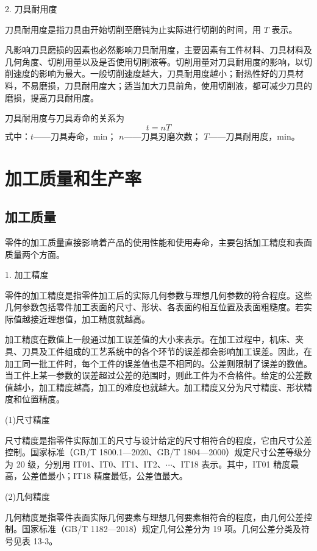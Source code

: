 \documentclass[UTF8]{ctexbook}
\newcommand{\◎}{\ensuremath{\bigcirc}}
\begin{document}
2. 刀具耐用度

刀具耐用度是指刀具由开始切削至磨钝为止实际进行切削的时间，用 $T$ 表示。

凡影响刀具磨损的因素也必然影响刀具耐用度，主要因素有工件材料、刀具材料及几何角度、切削用量以及是否使用切削液等。切削用量对刀具耐用度的影响，以切削速度的影响为最大。一般切削速度越大，刀具耐用度越小；耐热性好的刀具材料，不易磨损，刀具耐用度大；适当加大刀具前角，使用切削液，都可减少刀具的磨损，提高刀具耐用度。

刀具耐用度与刀具寿命的关系为
\[ t = nT \]
式中：$t$——刀具寿命，min；
$n$——刀具刃磨次数；
$T$——刀具耐用度，min。

\section{加工质量和生产率}

\subsection{加工质量}

零件的加工质量直接影响着产品的使用性能和使用寿命，主要包括加工精度和表面质量两个方面。

1. 加工精度

零件的加工精度是指零件加工后的实际几何参数与理想几何参数的符合程度。这些几何参数包括零件加工表面的尺寸、形状、各表面的相互位置及表面粗糙度。若实际值越接近理想值，加工精度就越高。

加工精度在数值上一般通过加工误差值的大小来表示。在加工过程中，机床、夹具、刀具及工件组成的工艺系统中的各个环节的误差都会影响加工误差。因此，在加工同一批工件时，每个工件的误差值也是不相同的。公差则限制了误差的数值。当工件上某一参数的误差超过公差的范围时，则此工件为不合格件。给定的公差数值越小，加工精度越高，加工的难度也就越大。加工精度又分为尺寸精度、形状精度和位置精度。


(1)尺寸精度

    尺寸精度是指零件实际加工的尺寸与设计给定的尺寸相符合的程度，它由尺寸公差控制。国家标准（GB/T 1800.1—2020、GB/T 1804—2000）规定尺寸公差等级分为 20 级，分别用 IT01、IT0、IT1、IT2、$\cdots$、IT18 表示。其中，IT01 精度最高，公差值最小；IT18 精度最低，公差值最大。

(2)几何精度

    几何精度是指零件表面实际几何要素与理想几何要素相符合的程度，由几何公差控制。国家标准（GB/T 1182—2018）规定几何公差分为 19 项。几何公差分类及符号见表 13-3。
\end{document}
